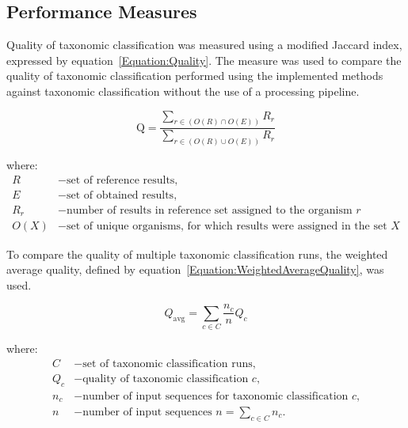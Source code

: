 \documentclass[pdflatex,sn-vancouver-num]{sn-jnl}%
\begin{document}
        \subsection{Performance Measures}
            Quality of taxonomic classification was measured using a modified Jaccard index, expressed by equation~\ref{Equation:Quality}. The measure was used to compare the quality of taxonomic classification performed using the implemented methods against taxonomic classification without the use of a processing pipeline.

            \begin{equation}
                \text{Q} = \frac{
                    \sum_{r \in (O(R) \cap O(E))} R_{r}
                }{
                    \sum_{r \in (O(R) \cup O(E))} R_{r}
                }
                \label{Equation:Quality}
            \end{equation}

            where:
            \begin{align*}
                R &- \text{set of reference results,} \\
                E &- \text{set of obtained results,} \\
                R_{r} &- \text{number of results in reference set assigned to the organism $r$} \\
                O(X) &- \text{set of unique organisms, for which results were assigned in the set $X$}
            \end{align*}

            To compare the quality of multiple taxonomic classification runs, the weighted average quality, defined by equation~\ref{Equation:WeightedAverageQuality}, was used.
            
            \begin{equation}
                Q_{\text{avg}} = \sum_{c \in C} \frac{n_c}{n} Q_c
                \label{Equation:WeightedAverageQuality}
            \end{equation}

            where:
            \begin{align*}
            C &- \text{set of taxonomic classification runs,} \\
            Q_c &- \text{quality of taxonomic classification $c$,} \\
            n_c &- \text{number of input sequences for taxonomic classification $c$,}\\
            n   &- \text{number of input sequences $n = \sum_{c \in C} n_{c}.$}
            \end{align*}
\end{document}
